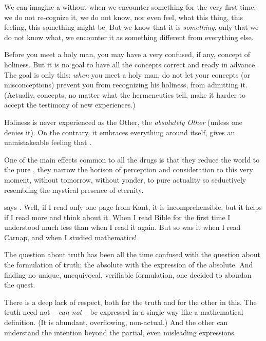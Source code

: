 
We can imagine a  without  when we 
encounter something for the very first time: we do not re-cognize it, 
we do not know, nor even feel, what this thing, this feeling, this 
something might be. But we know that it is {\em something}, only that we 
do not know what, we encounter it as something different from everything else.

Before you meet a holy man, you may have a very confused, if any, 
concept of holiness. But it is no goal to have all the concepts 
correct and ready in advance. The goal is only this: {\em when} you 
meet a holy man, do not let your concepts (or misconceptions) prevent 
you from recognizing his holiness, from admitting it. (Actually, concepts, no 
matter what the hermeneutics tell, make it harder to accept the 
testimony of new experiences.)

Holiness is never experienced as the Other, the {\em absolutely 
Other} (unless one denies it). On the contrary, it embraces 
everything around itself, gives an unmistakeable feeling that 
.

One of the main effects common to all the drugs is that they reduce 
the world to the pure \herenow, they narrow the horison of perception 
and consideration to this very moment, without tomorrow, without 
yonder, to pure actuality so seductively resembling the mystical 
presence of eternity.

says . Well, if I read 
only one page from Kant, it is incomprehensible, but it helps if I 
read more and think about it. When I read Bible for the first time I 
understood much less than when I read it again. But so was it when I 
read Carnap, and when I studied mathematics!

The question about truth has been all the time confused with the 
question about the formulation of truth; the absolute 
with the expression of the absolute. And finding no unique, 
unequivocal, verifiable formulation, one decided to abandon the quest.

There is a deep lack of respect, both for the truth and for the other 
in this. The truth need not -- {\em can not} -- be expressed in a 
single way like a mathematical definition. (It is abundant, 
overflowing, non-actual.) And the other can understand the intention beyond 
the partial, even misleading expressions.


